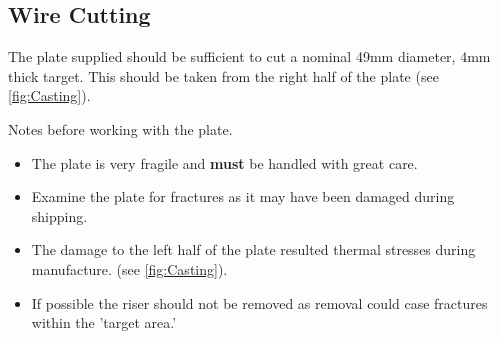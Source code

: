 \subsection{Wire Cutting}
The plate supplied should be sufficient to cut a nominal 49mm diameter, 4mm thick target. This should be taken from the right half of the plate (see \ref{fig:Casting}). 

Notes before working with the plate.
\begin{itemize}
\item The plate is very fragile and \textbf{must} be handled with great care. 
\item Examine the plate for fractures as it may have been damaged during shipping. 
\item The damage to the left half of the plate resulted thermal stresses during manufacture. (see \ref{fig:Casting}). 
\item If possible the riser should not be removed as removal could case fractures within the 'target area.'
\end{itemize}
